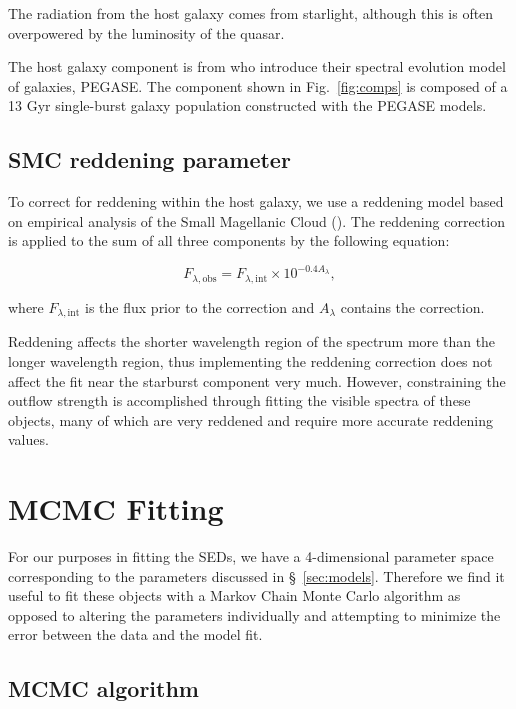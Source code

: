 The radiation from the host galaxy comes from starlight, although this is often overpowered by the luminosity of 
the quasar.

The host galaxy component is from \cite{fioc1997} who introduce their spectral evolution model of galaxies, PEGASE. 
The component shown in Fig.~\ref{fig:comps} is composed of a 13 Gyr single-burst galaxy population constructed with 
the PEGASE models.

\subsection{SMC reddening parameter}
\label{sec:smc}

To correct for reddening within the host galaxy, we use a reddening model based on empirical analysis of the Small Magellanic Cloud 
(\citealp{prevot1984}). The reddening correction is applied to the sum of all three components by the following equation:

\begin{equation}
  \label{eq:red}
  F_{\lambda,\mathrm{obs}} = F_{\lambda,\mathrm{int}} \times 10^{-0.4A_{\lambda}},
\end{equation}

where $F_{\lambda,\mathrm{int}}$ is the flux prior to the correction and $A_{\lambda}$ contains the correction. 

Reddening affects the shorter wavelength region of the spectrum more than the longer wavelength region, thus implementing 
the reddening correction does not affect the fit near the starburst component very much. However, constraining the outflow 
strength is accomplished through fitting the visible spectra of these objects, many of which are very reddened and require 
more accurate reddening values. 

\section{MCMC Fitting}
\label{sec:fitting}

For our purposes in fitting the SEDs, we have a 4-dimensional parameter space corresponding to the parameters discussed in \S~\ref{sec:models}. 
Therefore we find it useful to fit these objects with a Markov Chain Monte Carlo algorithm as opposed to altering the parameters individually 
and attempting to minimize the error between the data and the model fit. 

\subsection{MCMC algorithm}
\label{sec:mcmc}

